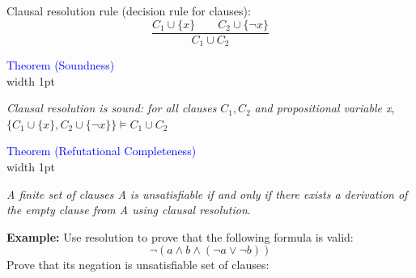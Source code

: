 \documentclass[11pt]{article}
\begin{document}
Clausal resolution rule (decision rule for clauses): 
$$\frac{C_1 \cup \{x\} \quad \quad C_2 \cup \{\neg x \}}{C_1 \cup C_2}$$

\textcolor{blue}{Theorem (Soundness)} \\
\noindent
\vrule width 1pt
\hspace{0.5em}
\begin{minipage}{0.9\textwidth}
\vspace{0.3cm}
\textit{Clausal resolution is sound: for all clauses} $C_1, C_2$ \textit{and propositional variable x}, \\
$\{C_1 \cup \{x\}, C_2 \cup \{\neg x\}\} \models C_1 \cup C_2$
\end{minipage}

\textcolor{blue}{Theorem (Refutational Completeness)} \\ 
\noindent
\vrule width 1pt
\hspace{0.5em}
\begin{minipage}{0.9\textwidth}
\vspace{0.3cm}
\textit{A finite set of clauses A is unsatisfiable if and only if there exists a derivation of the empty clause from A using clausal resolution}. 
\end{minipage}

\textbf{Example:} Use resolution to prove that the following formula is valid: $$\neg(a \land b \land (\neg a \lor \neg b))$$ Prove that its negation is unsatisfiable set of clauses: 

\begin{figure}[H]
    \centering
\end{figure}
\end{document}
